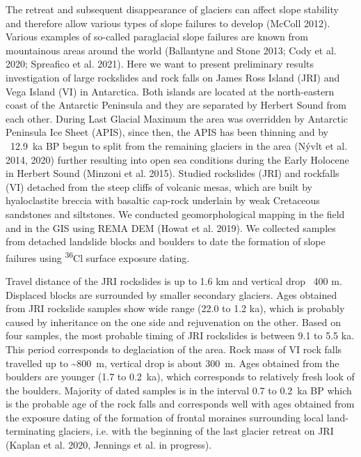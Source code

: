 {The retreat and subsequent disappearance of glaciers can affect slope stability and therefore allow various types of slope failures to develop (McColl 2012). Various examples of so-called paraglacial slope failures are known from mountainous areas around the world (Ballantyne and Stone 2013; Cody et al. 2020; Spreafico et al. 2021). Here we want to present preliminary results investigation of large rockslides and rock falls on James Ross Island (JRI) and Vega Island (VI) in Antarctica. Both islands are located at the north-eastern coast of the Antarctic Peninsula and they are separated by Herbert Sound from each other. During Last Glacial Maximum the area was overridden by Antarctic Peninsula Ice Sheet (APIS), since then, the APIS has been thinning and by ~12.9~ka BP begun to split from the remaining glaciers in the area (Nývlt et al. 2014, 2020) further resulting into open sea conditions during the Early Holocene in Herbert Sound (Minzoni et al. 2015). Studied rockslides (JRI) and rockfalls (VI) detached from the steep cliffs of volcanic mesas, which are built by hyaloclastite breccia with basaltic cap-rock underlain by weak Cretaceous sandstones and siltstones. We conducted geomorphological mapping in the field and in the GIS using REMA DEM (Howat et al. 2019). We collected samples from detached landslide blocks and boulders to date the formation of slope failures using \textsuperscript{36}Cl surface exposure dating. 
		
Travel distance of the JRI rockslides is up to 1.6 km and vertical drop ~400 m. Displaced blocks are surrounded by smaller secondary glaciers. Ages obtained from JRI rockslide samples show wide range (22.0 to 1.2 ka), which is probably caused by inheritance on the one side and rejuvenation on the other. Based on four samples, the most probable timing of JRI rockslides is between 9.1 to 5.5 ka. This period corresponds to deglaciation of the area. Rock mass of VI rock falls travelled up to \textasciitilde800~m, vertical drop is about 300~m. Ages obtained from the boulders are younger (1.7 to 0.2~ka), which corresponds to relatively fresh look of the boulders. Majority of dated samples is in the interval 0.7 to 0.2~ka BP which is the probable age of the rock falls and corresponds well with ages obtained from the exposure dating of the formation of frontal moraines surrounding local land-terminating glaciers, i.e. with the beginning of the last glacier retreat on JRI (Kaplan et al. 2020, Jennings et al. in progress). 
	
}
